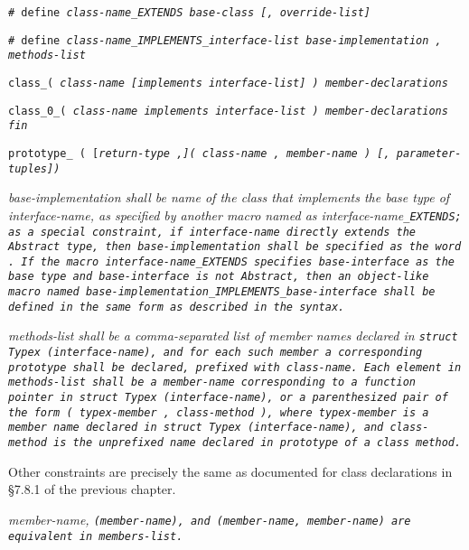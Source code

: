 
\tt{# define} \it{class-name}\tt{_EXTENDS}
\it{base-class} [\tt{,} \it{override-list}]

\tt{# define} \it{class-name}\tt{_IMPLEMENTS_}\it{interface-list}
\it{base-implementation} \tt{,} \it{methods-list}

\tt{class_}\s\s\s\tt{(} \it{class-name} [\tt{implements}
\it{interface-list}] \tt{)} \it{member-declarations} 

\tt{class_0_}\s\tt{(} \it{class-name} \phantom{[}\tt{implements}
\it{interface-list}\phantom{]}  \tt{)} \it{member-declarations} \tt{fin}

\tt{prototype_ (} [\it{return-type} \tt{,}]\s\tt{(} \it{class-name}
\tt{,} \it{member-name} \tt{)} [\tt{,} \it{parameter-tuples}]\s\tt{)}\\


\it{base-implementation} shall be name of the class that implements
the base type of \it{interface-name}, as specified by another macro
named as \it{interface-name}\tt{_EXTENDS}; as a special constraint,
if \it{interface-name} directly extends the \tt{Abstract} type,
then \it{base-implementation} shall be specified as the word .
If the macro \it{interface-name}\tt{_EXTENDS} specifies \it{base-interface} as
the base type and \it{base-interface} is not \tt{Abstract}, then an object-like
macro named \it{base-implementation}\tt{_IMPLEMENTS_}\it{base-interface}
shall be defined in the same form as described in the syntax.

\it{methods-list} shall be a comma-separated list of member names declared
in \tt{struct Typex (}\it{interface-name}\tt{)}, and for each such member
a corresponding prototype shall be declared, prefixed with \it{class-name}.
Each element in \it{methods-list} shall be a
\it{member-name} corresponding to a function pointer in
\tt{struct Typex (}\it{interface-name}\tt{)}, or a parenthesized pair of the form
\tt{(} \it{typex-member} \tt{,} \it{class-method} \tt{)}, where \it{typex-member}
is a member name declared in \tt{struct Typex (}\it{interface-name}\tt{)}, and
\it{class-method} is the unprefixed name declared in prototype of a class method.

Other constraints are precisely the same as documented
for class declarations in \S 7.8.1 of the previous chapter.

\note \it{member-name},
\tt{(}\it{member-name}\tt{)}, and \tt{(}\it{member-name}\tt{,} \it{member-name}\tt{)}
are equivalent in \it{members-list}.

